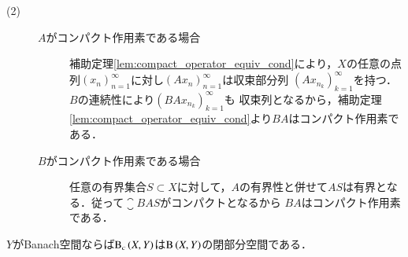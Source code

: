 \begin{prf}
\begin{description}
			\item[(2)]
				\begin{description}
					\item[$A$がコンパクト作用素である場合]
						補助定理\ref{lem:compact_operator_equiv_cond}により，$X$の任意の点列$(x_n)_{n=1}^{\infty}$に対し$(Ax_n)_{n=1}^{\infty}$は収束部分列
						$\left(Ax_{n_k}\right)_{k=1}^{\infty}$を持つ．$B$の連続性により$\left(BAx_{n_k}\right)_{k=1}^{\infty}$も
						収束列となるから，補助定理\ref{lem:compact_operator_equiv_cond}より$BA$はコンパクト作用素である．
					
					\item[$B$がコンパクト作用素である場合]
						任意の有界集合$S \subset X$に対して，$A$の有界性と併せて$AS$は有界となる．従って$\closure{BAS}$がコンパクトとなるから
						$BA$はコンパクト作用素である．
						\QED
				\end{description}
		\end{description}
	\end{prf}
	
	
	\begin{screen}
		\begin{prp}
			$Y$がBanach空間ならば$\mathrm{B}_c\left(X,Y\right) $は$\mathrm{B}\left(X,Y\right) $の閉部分空間である．
		\end{prp}
	\end{screen}
	
